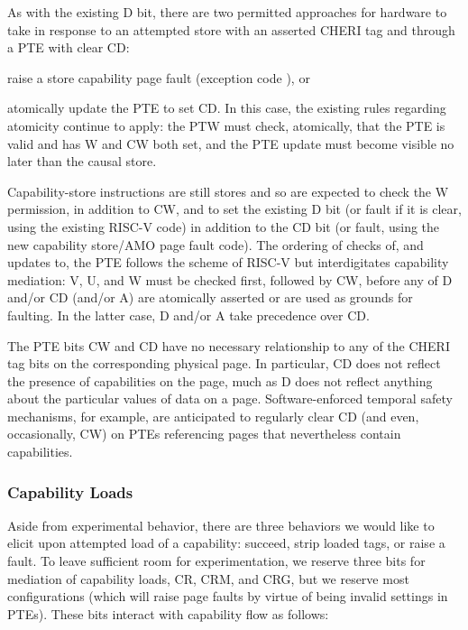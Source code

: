 As with the existing D bit, there are two permitted approaches for hardware to
take in response to an attempted store with an asserted CHERI tag and through a
PTE with clear CD:
%
\begin{inenum}
%
  \item raise a store capability page fault (exception code
  \riscvstorecappagefault{}), or
%
  \item atomically update the PTE to set CD.  In this case, the existing rules
  regarding atomicity continue to apply: the PTW must check, atomically, that
  the PTE is valid and has W and CW both set, and the PTE update must become
  visible no later than the causal store.
%
\end{inenum}
%
Capability-store instructions are still stores and so are expected to check the
W permission, in addition to CW, and to set the existing D bit (or fault if it
is clear, using the existing RISC-V \xcause{} code) in addition to the CD bit
(or fault, using the new capability store/AMO page fault \xcause{} code).
%
The ordering of checks of, and updates to, the PTE follows the scheme of RISC-V
but interdigitates capability mediation: V, U, and W must be checked first,
followed by CW, before any of D and/or CD (and/or A) are atomically asserted or
are used as grounds for faulting.  In the latter case, D and/or A take
precedence over CD.

The PTE bits CW and CD have no necessary relationship to any of the CHERI tag
bits on the corresponding physical page.  In particular, CD does not reflect
the presence of capabilities on the page, much as D does not reflect anything
about the particular values of data on a page.  Software-enforced temporal
safety mechanisms, for example, are anticipated to regularly clear CD (and
even, occasionally, CW) on PTEs referencing pages that nevertheless contain
capabilities.

\subsubsection{Capability Loads}

Aside from experimental behavior, there are three
behaviors we would like to elicit upon attempted load of a capability: succeed,
strip loaded tags, or raise a fault.  To leave sufficient room for
experimentation, we reserve three bits for mediation of capability loads, CR,
CRM, and CRG, but we reserve most configurations (which will raise page faults
by virtue of being invalid settings in PTEs).  These bits interact with
capability flow as follows:

